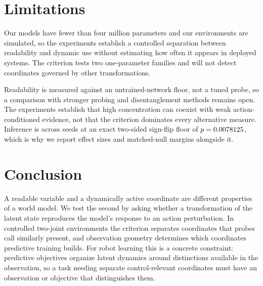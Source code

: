 \documentclass{article}
\begin{document}
\ARCHPARA

\DOMAINPARA

\VALIDITYPARA

\section{Limitations}

\LIMSCOPE{}

Our models have fewer than four million parameters and our environments are simulated, so the experiments establish a controlled separation between readability and dynamic use without estimating how often it appears in deployed systems. The criterion tests two one-parameter families and will not detect coordinates governed by other transformations.

Readability is measured against an untrained-network floor, not a tuned probe, so a comparison with stronger probing and disentanglement methods \citep{higgins2017betavae,locatello2019challenging} remains open. The experiments establish that high concentration can coexist with weak action-conditioned evidence, not that the criterion dominates every alternative measure. Inference is across seeds at an exact two-sided sign-flip floor of $p=0.0078125$, which is why we report effect sizes and matched-null margins alongside it.

\section{Conclusion}

A readable variable and a dynamically active coordinate are different properties of a world model. We test the second by asking whether a transformation of the latent state reproduces the model's response to an action perturbation. In controlled two-joint environments the criterion separates coordinates that probes call similarly present, and observation geometry determines which coordinates predictive training builds. For robot learning this is a concrete constraint: predictive objectives organize latent dynamics around distinctions available in the observation, so a task needing separate control-relevant coordinates must have an observation or objective that distinguishes them.



\end{document}
